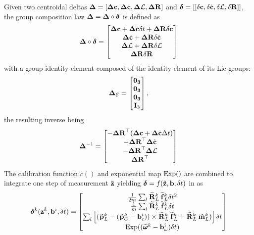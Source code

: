 Given two centroidal deltas ${{\bm \Delta}}=[{{\bm \Delta}}{\bf c},{{\bm \Delta}}\dot{{\bf c}},{{\bm \Delta}}\mathcal{L}, {\bm \Delta {\bf R}}]$ and ${\bm \delta}=[[\delta{\bf c},\delta\dot{{\bf c}},\delta\mathcal{L}, {\delta{\bf R}}]]$, 
the group composition law ${{\bm \Delta}}={{\bm \Delta}}\circ\bm\delta$ is defined as
%
\begin{equation} 
    \D \circ \bm\delta
    =
    \begin{bmatrix}
        \D\COM + \D\COMd\dt + \DR\delta\COM \\
        \D\COMd + \DR\delta\COMd \\
        \D\AM + \DR\delta\AM \\
        \DR\dR 
    \end{bmatrix}
    \label{eq:composition_delta_com}
\end{equation}
%
with a group identity element composed of the identity element of its Lie groups:
%
\begin{equation}
    {{\bm \Delta}}_{\mathcal{E}} = \begin{bmatrix}
    \bf0_3\\ \bf0_3 \\ \bf0_3 \\ {\bf I}_3
    \end{bmatrix},
\end{equation}
%
the resulting inverse being
%
\begin{equation}
    \D^{-1} =     
    \begin{bmatrix}
    - \DR\tr(\D\COM + \D\COMd \Dt) \\
    - \DR\tr \D\COMd \\
    - \DR\tr \D\AM \\
      \DR\tr
    \end{bmatrix}
\label{eq:inverse_delta_com}
\end{equation}
%
The calibration function $c()$ and exponential map $\operatorname*{Exp}()$ are combined to integrate one step of measurement $\tilde{{\bf z}}$
yielding $\bm\delta=f(\tilde{{\bf z}},{\bf b},\delta t)$ in  as
%
\begin{equation}
    \bm\delta^{k}(\bfz^k, \bfb^i, \dt) =
    \begin{bmatrix}
    \frac{1}{2m} \sum_l \Rotm{}{L}^k \forcem{}{L}^k \dt^2
    \\
    \frac{1}{m} \sum_l \Rotm{}{L}^k \forcem{}{L}^k \dt 
    \\
    \sum_l\left[ (\posim{}{L}^k - (\posim{}{C}^k - \bias_c^i)) \times \Rotm{}{L}^k \forcem{}{L}^k + \Rotm{}{L}^k\torquem{}{L}^k) \right] \dt
    \\
    \Exp((\angvelm{}{}^k - \bias_{\omega}^i)\dt)
    \end{bmatrix}
    \label{eq:data2delta_com}
\end{equation}
%





